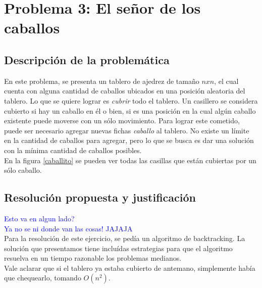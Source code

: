 \section{Problema 3: El se\~nor de los caballos}
\subsection{Descripci\'on de la problem\'atica}

En este problema, se presenta un tablero de ajedrez de tama\~no $nxn$, el cual cuenta con alguna cantidad de caballos ubicados en una posici\'on aleatoria del tablero. Lo que se quiere lograr es \emph{cubrir} todo el tablero. Un casillero se considera cubierto si hay un caballo en \'el o bien, si es una posici\'on en la cual alg\'un caballo existente puede moverse con un s\'olo movimiento. Para lograr este cometido, puede ser necesario agregar nuevas fichas \emph{caballo} al tablero. No existe un l\'imite en la cantidad de caballos para agregar, pero lo que se busca es dar una soluci\'on con la m\'inima cantidad de caballos posibles.\\


En la figura \ref{caballito} se pueden ver todas las casillas que est\'an cubiertas por un s\'olo caballo.





\newpage
\subsection{Resoluci\'on propuesta y justificaci\'on}
\textcolor{blue}{Esto va en algun lado?}\\
\textcolor{blue}{Ya no se ni donde van las cosas! JAJAJA}\\

Para la resoluci\'on de este ejercicio, se ped\'ia un algoritmo de backtracking. La soluci\'on que presentamos tiene inclu\'idas estrategias para que el algoritmo resuelva en un tiempo razonable los problemas medianos.\\

Vale aclarar que si el tablero ya estaba cubierto de antemano, simplemente hab\'ia que chequearlo, tomando $O(n^{2})$.\\

